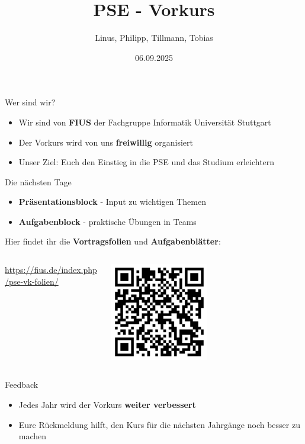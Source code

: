 \documentclass{../../presentation}
\title{PSE - Vorkurs}
\author{Linus, Philipp, Tillmann, Tobias}
\institute{FIUS - Fachgruppe Informatik Universität Stuttgart}
\date{06.09.2025}
\begin{document}
\begin{frame}
  \titlepage
\end{frame}

\begin{frame}{Wer sind wir?}
  \begin{itemize}
    \item Wir sind von \textbf{FIUS} der Fachgruppe Informatik Universität Stuttgart
    \item Der Vorkurs wird von uns \textbf{freiwillig} organisiert
    \item Unser Ziel: Euch den Einstieg in die PSE und das Studium erleichtern
  \end{itemize}
\end{frame}

\begin{frame}{Die nächsten Tage}
  \begin{itemize}
    \item \textbf{Präsentationsblock} - Input zu wichtigen Themen
    \item \textbf{Aufgabenblock} - praktische Übungen in Teams
  \end{itemize}
  \achtung{} Hier findet ihr die \textbf{Vortragsfolien} und \textbf{Aufgabenblätter}:
  \begin{columns}
    \begin{column}{0.7\textwidth}
      \url{https://fius.de/index.php/pse-vk-folien/}
    \end{column}
    \begin{column}{0.3\textwidth}
      \includegraphics[width=0.5\textwidth]{../img/pseFolien.png}
    \end{column}
  \end{columns}
\end{frame}

\begin{frame}{Feedback}
  \begin{itemize}
    \item Jedes Jahr wird der Vorkurs \textbf{weiter verbessert}
    \item Eure Rückmeldung hilft, den Kurs für die nächsten Jahrgänge noch besser zu machen
  \end{itemize}
\end{frame}
\end{document}
